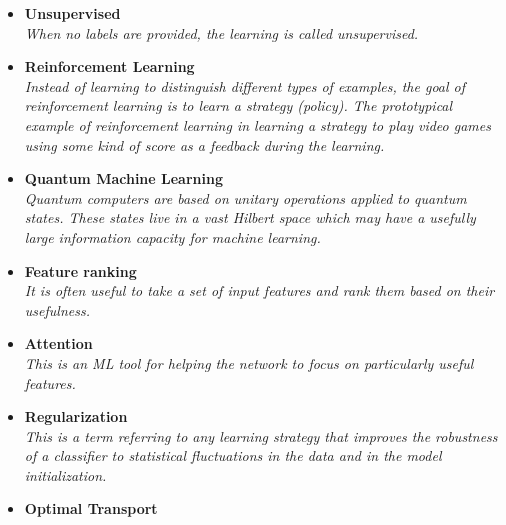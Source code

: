 \documentclass[12pt,letterpaper]{article}
\begin{document}
\begin{itemize}
\begin{itemize}
\begin{itemize}
				\item \textbf{Unsupervised}~\cite{Mackey:2015hwa,Komiske:2019fks,1797846,Dillon:2019cqt,Cai:2020vzx,Howard:2021pos,Dillon:2021gag,Huang:2023kgs}
				\\\textit{When no labels are provided, the learning is called unsupervised.}
				\item \textbf{Reinforcement Learning}~\cite{Carrazza:2019efs,Brehmer:2020brs,John:2020sak,Harvey:2021oue,Cranmer:2021gdt,Windisch:2021mem,Dersy:2022bym,Nishimura:2023wdu}
				\\\textit{Instead of learning to distinguish different types of examples, the goal of reinforcement learning is to learn a strategy (policy).  The prototypical example of reinforcement learning in learning a strategy to play video games using some kind of score as a feedback during the learning.}
				\item \textbf{Quantum Machine Learning}~\cite{Mott:2017xdb,Zlokapa:2019lvv,Blance:2020nhl,Terashi:2020wfi,Chen:2020zkj,Wu:2020cye,Guan:2020bdl,Chen:2021ouz,Blance:2021gcs,Heredge:2021vww,Wu:2021xsj,Belis:2021zqi,Araz:2021ifk,Bravo-Prieto:2021ehz,Kim:2021wrr,Ngairangbam:2021yma,Gianelle:2022unu,Abel:2022lqr,Araz:2022haf,Delgado:2022aty,Alvi:2022fkk,Peixoto:2022zzk,Araz:2022zxk,Duckett:2022ccc,Rousselot:2023pcj,Schuhmacher:2023pro,Rehm:2023ovj}
				\\\textit{Quantum computers are based on unitary operations applied to quantum states.  These states live in a vast Hilbert space which may have a usefully large information capacity for machine learning.}
				\item \textbf{Feature ranking}~\cite{Faucett:2020vbu,Grojean:2020ech,Das:2022cjl}
				\\\textit{It is often useful to take a set of input features and rank them based on their usefulness.}
				\item \textbf{Attention}~\cite{goto2021development,Finke:2023veq,Qiu:2023ihi,Biassoni:2023lih,Kach:2023rqw}
				\\\textit{This is an ML tool for helping the network to focus on particularly useful features.}
				\item \textbf{Regularization}~\cite{Araz:2021wqm,Sforza:2013hua}
				\\\textit{This is a term referring to any learning strategy that improves the robustness of a classifier to statistical fluctuations in the data and in the model initialization.}
				\item \textbf{Optimal Transport}~\cite{Komiske:2019fks,Cai:2020vzx,Romao:2020ojy,Pollard:2021fqv,Cai:2021hnn,Manole:2022bmi,Gouskos:2022xvn,ATLAS:2023mny}

\end{itemize}
\end{itemize}
\end{itemize}
\end{document}
